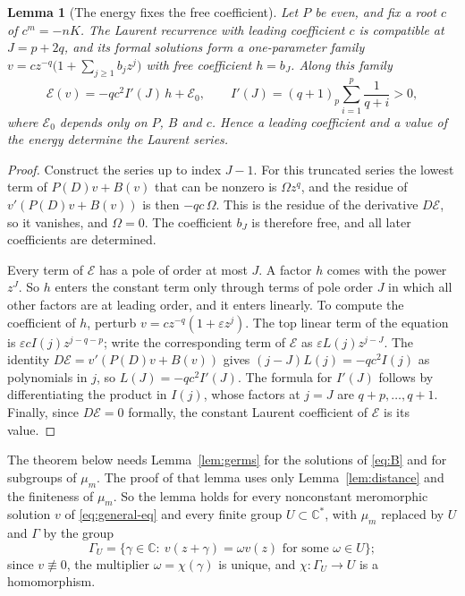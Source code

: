 \documentclass[11pt]{article}
\newtheorem{lemma}[theorem]{Lemma}
\theoremstyle{definition}
\theoremstyle{remark}
\numberwithin{equation}{section}
\newcommand{\CC}{\mathbb C}
\begin{document}
\begin{lemma}[The energy fixes the free coefficient]\label{lem:energy}
Let \(P\) be even, and fix a root \(c\) of \(c^m=-nK\). The Laurent
recurrence with leading coefficient \(c\) is compatible at \(J=p+2q\),
and its formal solutions form a one-parameter family
\(v=cz^{-q}\bigl(1+\sum_{j\ge1}b_jz^j\bigr)\) with free coefficient
\(h=b_J\). Along this family
\begin{equation}\label{eq:energy-h}
 \mathcal E(v)=-qc^2I'(J)\,h+\mathcal E_0,\qquad
 I'(J)=(q+1)_p\sum_{i=1}^{p}\frac{1}{q+i}>0,
\end{equation}
where \(\mathcal E_0\) depends only on \(P\), \(B\) and \(c\). Hence a
leading coefficient and a value of the energy determine the Laurent
series.
\end{lemma}

\begin{proof}
Construct the series up to index \(J-1\). For this truncated series the
lowest term of \(P(D)v+B(v)\) that can be nonzero is \(\Omega z^q\), and
the residue of \(v'(P(D)v+B(v))\) is then \(-qc\,\Omega\). This is the
residue of the derivative \(D\mathcal E\), so it vanishes, and
\(\Omega=0\). The coefficient \(b_J\) is therefore free, and all later
coefficients are determined.

Every term of \(\mathcal E\) has a pole of order at most \(J\). A
factor \(h\) comes with the power \(z^J\). So \(h\) enters the constant
term only through terms of pole order \(J\) in which all other factors
are at leading order, and it enters linearly. To compute the coefficient of \(h\), perturb
\(v=cz^{-q}(1+\varepsilon z^j)\). The top
linear term of the equation is \(\varepsilon cI(j)z^{j-q-p}\); write the
corresponding term of \(\mathcal E\) as \(\varepsilon L(j)z^{j-J}\). The
identity \(D\mathcal E=v'(P(D)v+B(v))\) gives \((j-J)L(j)=-qc^2I(j)\)
as polynomials in \(j\), so \(L(J)=-qc^2I'(J)\). The formula for
\(I'(J)\) follows by differentiating the product in \(I(j)\), whose
factors at \(j=J\) are \(q+p,\dots,q+1\). Finally, since
\(D\mathcal E=0\) formally, the constant Laurent coefficient of
\(\mathcal E\) is its value.
\end{proof}

The theorem below needs Lemma~\ref{lem:germs} for the solutions of
\eqref{eq:B} and for subgroups of \(\mu_m\). The proof of that lemma
uses only Lemma~\ref{lem:distance} and the finiteness of \(\mu_m\). So
the lemma holds for every nonconstant meromorphic solution \(v\) of
\eqref{eq:general-eq} and every finite group \(U\subset\CC^*\), with
\(\mu_m\) replaced by \(U\) and \(\Gamma\) by the group
\[
 \Gamma_U=\{\gamma\in\CC:\ v(z+\gamma)=\omega v(z)
 \text{ for some }\omega\in U\};
\]
since \(v\not\equiv0\), the multiplier \(\omega=\chi(\gamma)\) is
unique, and \(\chi\colon\Gamma_U\to U\) is a homomorphism.
\end{document}
